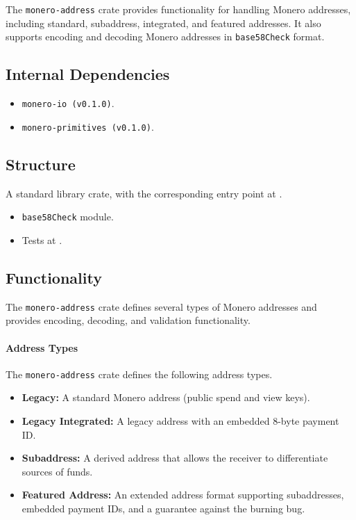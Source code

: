 \documentclass[12pt,a4paper]{article}
\begin{document}
The \texttt{monero-address} crate provides functionality for handling Monero addresses, including standard, subaddress, integrated, and featured addresses.  It also supports encoding and decoding Monero addresses in \texttt{base58Check} format.

\subsection{Internal Dependencies}

\begin{itemize}
    \item \texttt{monero-io (v0.1.0)}.
    \item \texttt{monero-primitives (v0.1.0)}.
\end{itemize}

\subsection{Structure}

A standard library crate, with the corresponding entry point at .

\begin{itemize}
    \item \texttt{base58Check} module.
    \item Tests at .
\end{itemize}

\subsection{Functionality}

The \texttt{monero-address} crate defines several types of Monero addresses and provides encoding, decoding, and validation functionality.

\paragraph{Address Types}

The \texttt{monero-address} crate defines the following address types.

\begin{itemize}
    \item \textbf{Legacy:} A standard Monero address (public spend and view keys).
    \item \textbf{Legacy Integrated:} A legacy address with an embedded $8$-byte payment ID.
    \item \textbf{Subaddress:} A derived address that allows the receiver to differentiate sources of funds.
    \item \textbf{Featured Address:} An extended address format supporting subaddresses, embedded payment IDs, and a guarantee against the burning bug.
\end{itemize}
\end{document}

